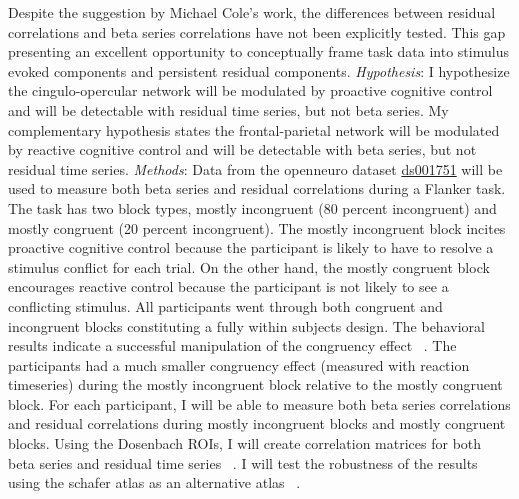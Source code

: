 \documentclass[phd,appendix,figures]{uithesis}
\begin{document}
Despite the suggestion by Michael Cole's work, the differences between residual correlations and beta series correlations have not been explicitly tested.
This gap presenting an excellent opportunity to conceptually frame task data into stimulus evoked components and persistent residual components.
\newline
\newline
\textit{Hypothesis}:
I hypothesize the cingulo-opercular network will be modulated by proactive cognitive control and will be detectable with residual time series, but not beta series.
My complementary hypothesis states the frontal-parietal network will be modulated by reactive cognitive control and will be detectable with beta series, but not residual time series. 
\newline
\newline
\textit{Methods}:
Data from the openneuro dataset \href{https://openneuro.org/datasets/ds001751/versions/1.0.0}{ds001751} will be used to measure both beta series and residual correlations during a Flanker task.
The task has two block types, mostly incongruent (80 percent incongruent) and mostly congruent (20 percent incongruent).
The mostly incongruent block incites proactive cognitive control because the participant is likely to have to resolve a stimulus conflict for each trial.
On the other hand, the mostly congruent block encourages reactive control because the participant is not likely to see a conflicting stimulus.
All participants went through both congruent and incongruent blocks constituting a fully within subjects design.
The behavioral results indicate a successful manipulation of the congruency effect ~\citep{Aben2019}.
The participants had a much smaller congruency effect (measured with reaction timeseries) during the mostly incongruent block relative to the mostly congruent block.
For each participant, I will be able to measure both beta series correlations and residual correlations during mostly incongruent blocks and mostly congruent blocks. 
Using the Dosenbach ROIs, I will create correlation matrices for both beta series and residual time series ~\citep{Dosenbach2010}.
I will test the robustness of the results using the schafer atlas as an alternative atlas ~\citep{schaefer2017}.
\end{document}
